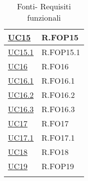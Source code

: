 \begin{longtable}{|P{4,5cm}|>{\arraybackslash}P{9cm}|}
  \hyperref[UC15]{UC15} & R.FOP15 \\
  \hline
  \hyperref[UC15point1]{UC15.1} & R.FOP15.1 \\
  \hline

  \hyperref[UC16]{UC16} & R.FO16 \\
  \hline
  \hyperref[UC16point1]{UC16.1} & R.FO16.1 \\
  \hline
  \hyperref[UC16point2]{UC16.2} & R.FO16.2 \\
  \hline
  \hyperref[UC16point3]{UC16.3} & R.FO16.3 \\
  \hline
  \hyperref[UC17]{UC17} & R.FO17 \\
  \hline
  \hyperref[UC17point1]{UC17.1} & R.FO17.1 \\
  \hline
  \hyperref[UC18]{UC18} & R.FO18 \\
  \hline
  \hyperref[UC19]{UC19} & R.FOP19 \\
  \hline
\caption{Fonti- Requisiti funzionali}
\end{longtable}
